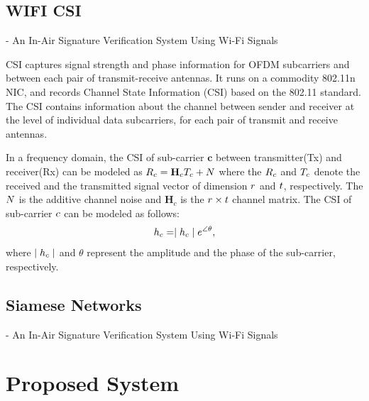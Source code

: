 \documentclass[runningheads]{llncs}
\begin{document}
\subsection{WIFI CSI}
- An In-Air Signature Verification System Using Wi-Fi Signals 

CSI captures signal strength and phase information for OFDM subcarriers and between each pair of transmit-receive antennas.
It runs on a commodity 802.11n NIC, and records Channel State Information (CSI) based on the 802.11 standard.
The CSI contains information about the channel between sender and receiver at the level of individual data subcarriers, for each pair of transmit and receive antennas.

In a frequency domain, the CSI of sub-carrier $\mathbf{c}$ between transmitter(Tx) and receiver(Rx) can be modeled as 
$\mathnormal{R}_{c} = \mathbf{H}_{c}\mathnormal{T}_{c} +\mathnormal{N}$ where the $\mathnormal{R}_{c}$ and $\mathnormal{T}_{c}$  denote the received and the transmitted signal vector of dimension $\mathnormal{r}$ and $\mathnormal{t}$, respectively. The $\mathnormal{N}$ is the additive channel noise and $\mathbf{H}_{c}$ is the $\mathnormal{r}\times\mathnormal{t}$ channel matrix. The CSI of sub-carrier $\mathnormal{c}$ can be modeled as follows:
\begin{equation}
    \mathnormal{h}_{c} = \mid\mathnormal{h}_{c}\mid\mathnormal{e}^{\angle\theta},
\end{equation}
where $\mid\mathnormal{h}_{c}\mid$ and $\theta$ represent the amplitude and the phase of the sub-carrier, respectively.

\subsection{Siamese Networks}
- An In-Air Signature Verification System Using Wi-Fi Signals 




\section{Proposed System}
\end{document}
